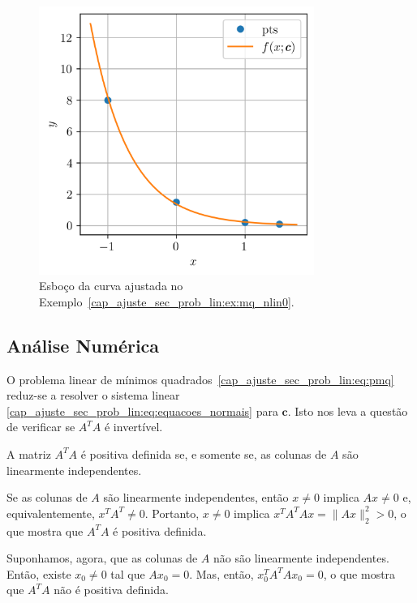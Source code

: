 \begin{ex}
\begin{figure}[H]
  \centering
  \includegraphics[width=0.8\textwidth]{cap_ajuste/dados/fig_mqUmPNLin/fig}
  \caption{Esboço da curva ajustada no Exemplo~\ref{cap_ajuste_sec_prob_lin:ex:mq_nlin0}.}
  \label{cap_ajuste_sec_prob_lin:fig:ex_mq_nlin0}
\end{figure}
\end{ex}

\subsection{Análise Numérica}

O problema linear de mínimos quadrados~\eqref{cap_ajuste_sec_prob_lin:eq:pmq} reduz-se a resolver o sistema linear \eqref{cap_ajuste_sec_prob_lin:eq:equacoes_normais} para $\pmb{c}$. Isto nos leva a questão de verificar se $A^TA$ é invertível.

\begin{teo}
  A matriz $A^TA$ é positiva definida se, e somente se, as colunas de $A$ são linearmente independentes.
\end{teo}
\begin{dem}
  Se as colunas de $A$ são linearmente independentes, então $x\neq 0$ implica $Ax\neq 0$ e, equivalentemente, $x^TA^T\neq 0$. Portanto, $x\neq 0$ implica $x^TA^TAx = \|Ax\|_2^2 > 0$, o que mostra que $A^TA$ é positiva definida.

  Suponhamos, agora, que as colunas de $A$ não são linearmente independentes. Então, existe $x_0\neq 0$ tal que $Ax_0 = 0$. Mas, então, $x_0^TA^TAx_0=0$, o que mostra que $A^TA$ não é positiva definida. 
\end{dem}

